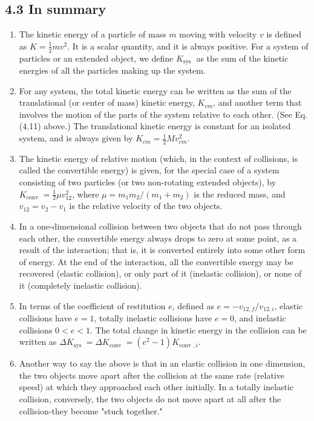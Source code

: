 \documentclass[10pt]{article}
\begin{document}
\subsection*{4.3 In summary}
\begin{enumerate}
  \item The kinetic energy of a particle of mass $m$ moving with velocity $v$ is defined as $K=\frac{1}{2} m v^{2}$. It is a scalar quantity, and it is always positive. For a system of particles or an extended object, we define $K_{\text {sys }}$ as the sum of the kinetic energies of all the particles making up the system.
  \item For any system, the total kinetic energy can be written as the sum of the translational (or center of mass) kinetic energy, $K_{c m}$, and another term that involves the motion of the parts of the system relative to each other. (See Eq. (4.11) above.) The translational kinetic energy is constant for an isolated system, and is always given by $K_{c m}=\frac{1}{2} M v_{c m}^{2}$.
  \item The kinetic energy of relative motion (which, in the context of collisions, is called the convertible energy) is given, for the special case of a system consisting of two particles (or two non-rotating extended objects), by $K_{\text {conv }}=\frac{1}{2} \mu v_{12}^{2}$, where $\mu=m_{1} m_{2} /\left(m_{1}+m_{2}\right)$ is the reduced mass, and $v_{12}=v_{2}-v_{1}$ is the relative velocity of the two objects.
  \item In a one-dimensional collision between two objects that do not pass through each other, the convertible energy always drops to zero at some point, as a result of the interaction; that is, it is converted entirely into some other form of energy. At the end of the interaction, all the convertible energy may be recovered (elastic collision), or only part of it (inelastic collision), or none of it (completely inelastic collision).
  \item In terms of the coefficient of restitution $e$, defined as $e=-v_{12, f} / v_{12, i}$, elastic collisions have $e=1$, totally inelastic collisions have $e=0$, and inelastic collisions $0<e<1$. The total change in kinetic energy in the collision can be written as $\Delta K_{\text {sys }}=\Delta K_{\text {conv }}=\left(e^{2}-1\right) K_{\text {conv }, i}$.
  \item Another way to say the above is that in an elastic collision in one dimension, the two objects move apart after the collision at the same rate (relative speed) at which they approached each other initially. In a totally inelastic collision, conversely, the two objects do not move apart at all after the collision-they become "stuck together."

\end{enumerate}
\end{document}
